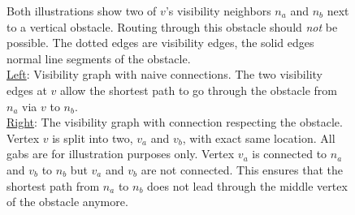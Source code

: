\begin{figure}[h]
\begin{figcenter}
				\end{figcenter}
				\caption{
					Both illustrations show two of $v$'s visibility neighbors $n_a$ and $n_b$ next to a vertical obstacle. Routing through this obstacle should \emph{not} be possible.
					The dotted edges are visibility edges, the solid edges normal line segments of the obstacle.
					\\
					\underline{Left}:
					Visibility graph with naive connections.
					The two visibility edges at $v$ allow the shortest path to go through the obstacle from $n_a$ via $v$ to $n_b$.
					\\
					\underline{Right}:
					The visibility graph with connection respecting the obstacle. Vertex $v$ is split into two, $v_a$ and $v_b$, with exact same location. All gabs are for illustration purposes only.
					Vertex $v_a$ is connected to $n_a$ and $v_b$ to $n_b$ but $v_a$ and $v_b$ are not connected.
					This ensures that the shortest path from $n_a$ to $n_b$ does not lead through the middle vertex of the obstacle anymore.
				}
				\label{fig:routing-through-line-obstacle}
			\end{figure}
			
